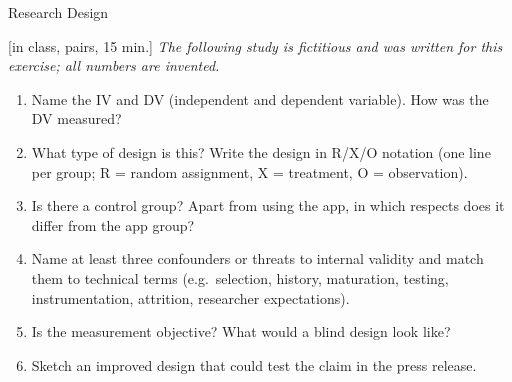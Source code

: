 \begin{uebungsblatt}{Research Design}

[in class, pairs, 15 min.]
\textit{The following study is fictitious and was written for this
exercise; all numbers are invented.}

\begin{center}
\end{center}

\begin{enumerate}
  \item Name the IV and DV (independent and dependent variable). How was
    the DV measured?
  \item What type of design is this? Write the design in R/X/O notation
    (one line per group; R = random assignment, X = treatment,
    O = observation).
  \item Is there a control group? Apart from using the app, in which
    respects does it differ from the app group?
  \item Name at least three confounders or threats to internal validity
    and match them to technical terms (e.g.\ selection, history,
    maturation, testing, instrumentation, attrition, researcher
    expectations).
  \item Is the measurement objective? What would a blind design look like?
  \item Sketch an improved design that could test the claim in the press
    release.
\end{enumerate}


\end{uebungsblatt}
